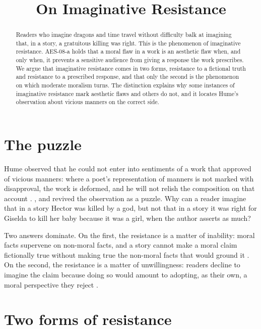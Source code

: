 \documentclass{situationist-preprint}
\title{On Imaginative Resistance}
\begin{document}
\maketitle

\begin{abstract}
Readers who imagine dragons and time travel without difficulty balk at imagining that, in a story, a gratuitous killing was right. This is the phenomenon of imaginative resistance. AES-08-a holds that a moral flaw in a work is an aesthetic flaw when, and only when, it prevents a sensitive audience from giving a response the work prescribes. We argue that imaginative resistance comes in two forms, resistance to a fictional truth and resistance to a prescribed response, and that only the second is the phenomenon on which moderate moralism turns. The distinction explains why some instances of imaginative resistance mark aesthetic flaws and others do not, and it locates Hume's observation about vicious manners on the correct side.
\end{abstract}

\section{The puzzle}

Hume observed that he could not enter into sentiments of a work that approved of vicious manners: where a poet's representation of manners is not marked with disapproval, the work is deformed, and he will not relish the composition on that account \citep{Hume1757}. \citet{Moran1994}, \citet{Walton1994} and \citet{Gendler2000} revived the observation as a puzzle. Why can a reader imagine that in a story Hector was killed by a god, but not that in a story it was right for Giselda to kill her baby because it was a girl, when the author asserts as much?

Two answers dominate. On the first, the resistance is a matter of inability: moral facts supervene on non-moral facts, and a story cannot make a moral claim fictionally true without making true the non-moral facts that would ground it \citep{Walton1994}. On the second, the resistance is a matter of unwillingness: readers decline to imagine the claim because doing so would amount to adopting, as their own, a moral perspective they reject \citep{Gendler2000}.

\section{Two forms of resistance}
\end{document}
